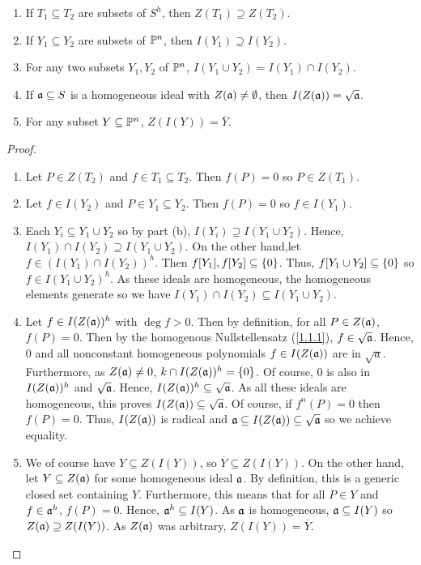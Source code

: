 \label{1.2.3}

\begin{enumerate}[label = (\alph*)]
    \item If $T_1 \subseteq T_2$ are subsets of $S^h$, then $Z(T_1) \supseteq Z(T_2)$.
    
    \item If $Y_1 \subseteq Y_2$ are subsets of $\P^n$, then $I(Y_1) \supseteq I(Y_2)$.
    
	\item For any two subsets $Y_1, Y_2$ of $\P^n$, $I(Y_1 \cup Y_2) = I(Y_1) \cap I(Y_2)$.
    
    \item If $\a \subseteq S$ is a homogeneous ideal with $Z(\a) \neq \emptyset$, then $I(Z(\a)) = \sqrt{\a}$.
    
    \item For any subset $Y \subseteq \P^n$, $Z(I(Y)) = \overline{Y}$.
\end{enumerate}

\begin{proof}
	\begin{enumerate}[label=(\alph*)]
		\item Let $P \in Z(T_2)$ and $f \in T_1 \subseteq T_2$. Then $f(P)=0$ so $P \in Z(T_1)$.

		\item Let $f \in I(Y_2)$ and $P \in Y_1 \subseteq Y_2$. Then $f(P)=0$ so $f \in I(Y_1)$.

		\item Each $Y_i \subseteq Y_1 \cup Y_2$ so by part (b), $I(Y_i) \supseteq I(Y_1 \cup Y_2)$. Hence, $I(Y_1)\cap I(Y_2) \supseteq I(Y_1 \cup Y_2)$. On the other hand,let $f \in (I(Y_1)\cap I(Y_2))^h$. Then $f[Y_1], f[Y_2]\subseteq \curly{0}$. Thus, $f[Y_1 \cup Y_2]\subseteq \curly{0}$ so $f \in I(Y_1 \cup Y_2)^h$. As these ideals are homogeneous, the homogeneous elements generate so we have $I(Y_1) \cap I(Y_2) \subseteq I(Y_1 \cup Y_2)$.

		\item Let $f \in I(Z(\a))^h$ with $\deg f > 0$. Then by definition, for all $P \in Z(\a)$, $f(P)=0$. Then by the homogenous Nullstellensatz (\ref{1.1.1}), $f \in \sqrt \a$. Hence, $0$ and all nonconstant homogeneous polynomials $f \in I(Z(\a))$ are in $\sqrt a$. Furthermore, as $Z(\a)\neq 0$, $k \cap I(Z(\a))^h = \curly{0}$. Of course, $0$ is also in $I(Z(\a))^h$ and $\sqrt \a$. Hence, $I(Z(\a))^h \subseteq \sqrt \a$. As all these ideals are homogeneous, this proves $I(Z(\a))\subseteq \sqrt \a$. Of course, if $f^n(P)=0$ then $f(P)=0$. Thus, $I(Z(\a))$ is radical and $\a \subseteq I(Z(\a)) \subseteq \sqrt \a$ so we achieve equality.

		\item We of course have $Y \subseteq Z(I(Y))$, so $\overline Y \subseteq Z(I(Y))$. On the other hand, let $Y \subseteq Z(\a)$ for some homogeneous ideal $\a$. By definition, this is a generic closed set containing $Y$. Furthermore, this means that for all $P \in Y$ and $f \in \a^h$, $f(P)=0$. Hence, $\a^h \subseteq I(Y)$. As $\a$ is homogeneous, $\a \subseteq I(Y)$ so $Z(\a) \supseteq Z(I(Y))$. As $Z(\a)$ was arbitrary, $Z(I(Y))=\overline Y$.
	\end{enumerate}	
\end{proof}
